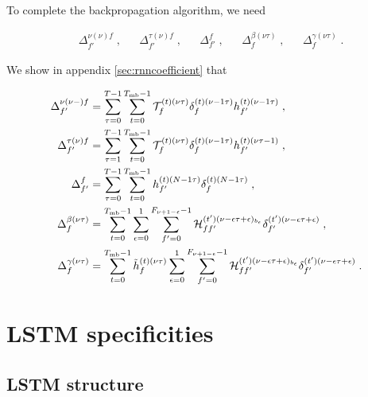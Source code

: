 To complete the backpropagation algorithm, we need

\begin{align}
&\Delta^{\nu(\nu)f}_{f'}\;,&
%
&\Delta^{\tau(\nu)f}_{f'}\;,&
%
&\Delta^{f}_{f'}\;,&
%
&\Delta^{\beta(\nu \tau)}_{f}\;,&
%
&\Delta^{\gamma(\nu \tau)}_{f}\;.
\end{align}

We show in appendix \ref{sec:rnncoefficient} that

\begin{align}
\Delta^{\nu(\nu-)f}_{f'}&=\sum_{\tau=0}^{T-1}\sum_{t=0}^{T_{{\rm mb}}-1}
%
\mathcal{T}^{(t)(\nu\tau)}_{f}\delta^{(t)(\nu-1\tau)}_{f}h^{(t)(\nu-1\tau)}_{f'}\;,\\
%
\Delta^{\tau(\nu)f}_{f'}&=\sum_{\tau=1}^{T-1}\sum_{t=0}^{T_{{\rm mb}}-1}
%
\mathcal{T}^{(t)(\nu\tau)}_{f}\delta^{(t)(\nu-1\tau)}_{f}h^{(t)(\nu\tau-1)}_{f'}\;,\\
%
\Delta^{f}_{f'}&=\sum_{\tau=0}^{T-1}\sum_{t=0}^{T_{{\rm mb}}-1} h^{(t)(N-1\tau)}_{f'}\delta^{(t)(N-1\tau)}_{f}\;,\\
%
\Delta^{\beta(\nu \tau)}_{f}&=\sum_{t=0}^{T_{{\rm mb}}-1}\sum_{\epsilon=0}^{1}\sum_{f'=0}^{F_{\nu+1-\epsilon}-1}
%
\mathcal{H}^{(t')(\nu-\epsilon\tau+\epsilon)_{b_\epsilon}}_{ff'}\delta^{(t')(\nu-\epsilon\tau+\epsilon)}_{f'}\;,\\
%
\Delta^{\gamma(\nu \tau)}_{f}&=\sum_{t=0}^{T_{{\rm mb}}-1}\tilde{h}^{(t)(\nu\tau)}_{f}\sum_{\epsilon=0}^{1}\sum_{f'=0}^{F_{\nu+1-\epsilon}-1}
%
\mathcal{H}^{(t')(\nu-\epsilon\tau+\epsilon)_{b_\epsilon}}_{ff'}\delta^{(t')(\nu-\epsilon\tau+\epsilon)}_{f'}\;.
\end{align}

\section{LSTM specificities}


\subsection{LSTM structure}


